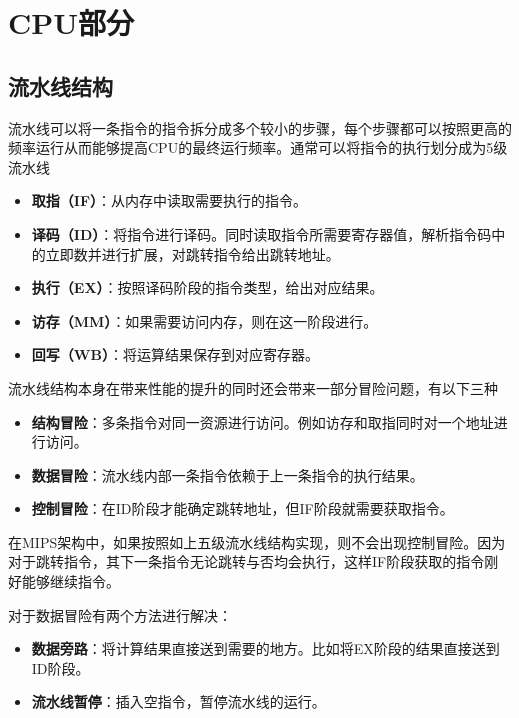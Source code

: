 \chapter{CPU部分}

\section{流水线结构}
流水线可以将一条指令的指令拆分成多个较小的步骤，每个步骤都可以按照更高的频率运行从而能够提高CPU的最终运行频率。通常可以将指令的执行划分成为5级流水线
\begin{itemize}
	\item \textbf{取指（IF）}：从内存中读取需要执行的指令。
	\item \textbf{译码（ID）}：将指令进行译码。同时读取指令所需要寄存器值，解析指令码中的立即数并进行扩展，对跳转指令给出跳转地址。
	\item \textbf{执行（EX）}：按照译码阶段的指令类型，给出对应结果。
	\item \textbf{访存（MM）}：如果需要访问内存，则在这一阶段进行。
	\item \textbf{回写（WB）}：将运算结果保存到对应寄存器。
\end{itemize}

流水线结构本身在带来性能的提升的同时还会带来一部分冒险问题，有以下三种
\begin{itemize}
	\item \textbf{结构冒险}：多条指令对同一资源进行访问。例如访存和取指同时对一个地址进行访问。
	\item \textbf{数据冒险}：流水线内部一条指令依赖于上一条指令的执行结果。
	\item \textbf{控制冒险}：在ID阶段才能确定跳转地址，但IF阶段就需要获取指令。
\end{itemize}

在MIPS架构中，如果按照如上五级流水线结构实现，则不会出现控制冒险。因为对于跳转指令，其下一条指令无论跳转与否均会执行，这样IF阶段获取的指令刚好能够继续指令。

对于数据冒险有两个方法进行解决：

\begin{itemize}
	\item \textbf{数据旁路}：将计算结果直接送到需要的地方。比如将EX阶段的结果直接送到ID阶段。
	\item \textbf{流水线暂停}：插入空指令，暂停流水线的运行。
\end{itemize}

